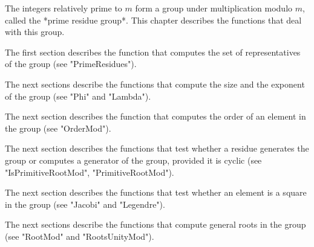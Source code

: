 %

The integers  relatively prime to  $m$ form a  group under multiplication
modulo $m$, called the *prime residue group*.  This chapter describes the
functions that deal with this group.

The  first  section  describes the  function  that  computes  the  set of
representatives of the group (see "PrimeResidues").

The next sections describe  the functions that  compute the  size and the
exponent of the group (see "Phi" and "Lambda").

The next  section  describes the function that computes  the  order of an
element in the group (see "OrderMod").

The  next  section  describes the functions that test  whether  a residue
generates the group or computes a  generator of the group, provided it is
cyclic (see "IsPrimitiveRootMod", "PrimitiveRootMod").

The next section describes  the functions that test whether an element is
a square in the group (see "Jacobi" and "Legendre").

The next  sections  describe the functions that compute general  roots in
the group (see "RootMod" and "RootsUnityMod").

